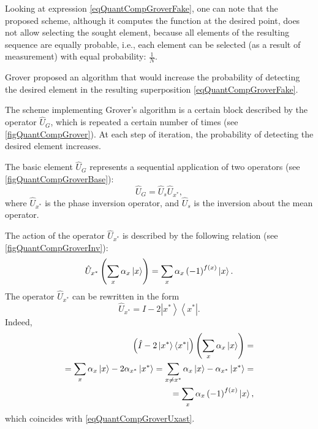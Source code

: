 

Looking at expression \eqref{eqQuantCompGroverFake}, one can
note that the proposed scheme, although it computes the function at the desired point,
does not allow selecting the sought element, because all elements of the resulting sequence
are equally probable, i.e., each element can be selected (as a result of measurement) with equal probability: $\frac{1}{N}$.

Grover proposed an algorithm that would increase
the probability of detecting the desired element in the resulting
superposition \eqref{eqQuantCompGroverFake}.





The scheme implementing Grover's algorithm is a certain block
described by the operator $\hat{U}_G$, which is repeated a certain number
of times (see \autoref{figQuantCompGrover}). At each step
of iteration, the probability of detecting the desired element increases.

The basic element $\hat{U}_G$ represents a sequential application
of two operators (see \autoref{figQuantCompGroverBase}):
\begin{equation}
\hat{U}_G=\hat{U}_s\hat{U}_{x^{\ast}},
\nonumber
\end{equation}
where $\hat{U}_{x^{\ast}}$ is the phase inversion operator, and $\hat{U}_s$
is the inversion about the mean operator.



The action of the operator $\hat{U}_{x^{\ast}}$ is described by the following relation
(see \autoref{figQuantCompGroverInv}):
\begin{equation}
\hat{U}_{x^{\ast}}\left(\sum_x \alpha_x \ket{x}\right) = 
\sum_x \alpha_x \left(-1\right)^{f\left(x\right)}\ket{x}.
\label{eqQuantCompGroverUxast}
\end{equation} 
The operator $\hat{U}_{x^{\ast}}$ can be rewritten in the form
\begin{equation}
\hat{U}_{x^{\ast}} = \hat{I} - 2 \left|x^{\ast}\right>\left<x^{\ast}\right|.
\nonumber
\end{equation} 
Indeed,
\begin{eqnarray}
\left(\hat{I} - 2 \left|x^{\ast}\right>\left<x^{\ast}\right|\right)
\left(\sum_x \alpha_x \ket{x}\right) =
\nonumber \\
= \sum_x \alpha_x \ket{x} - 2 \alpha_{x^{\ast}}
\left|x^{\ast}\right> = 
\sum_{x\ne x^{\ast}} \alpha_x \ket{x} -  \alpha_{x^{\ast}}
\left|x^{\ast}\right> =
\nonumber \\
=
\sum_x \alpha_x \left(-1\right)^{f\left(x\right)}\ket{x},
\nonumber
\end{eqnarray}
which coincides with \eqref{eqQuantCompGroverUxast}.

